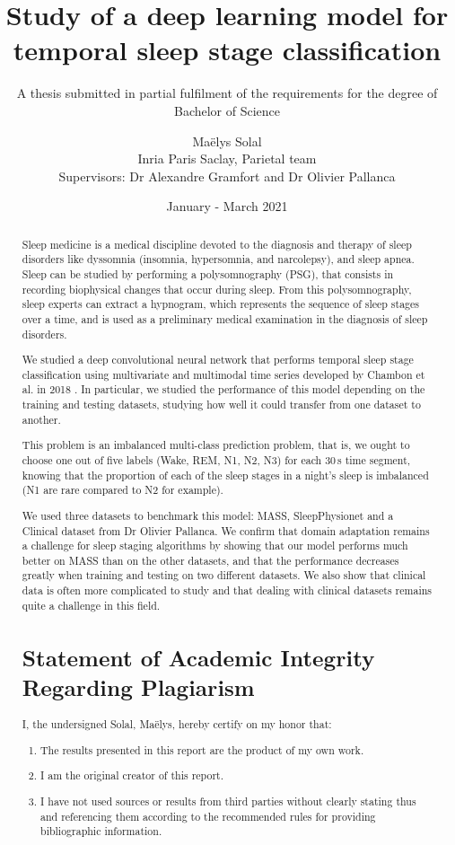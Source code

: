 \documentclass[titlepage, 11pt, a4paper, fancysections]{article}
\title[Sleep Stage Classification - Bachelor Thesis Report]{Study of a deep learning model for temporal sleep stage classification}
\subtitle{A thesis submitted in partial fulfilment of the requirements for the degree of \\ Bachelor of Science}
\author{Ma\"elys Solal\\ Inria Paris Saclay, Parietal team\\ Supervisors: Dr Alexandre Gramfort and Dr Olivier Pallanca}
\date{January - March 2021}
\begin{document}
\maketitle


\begin{abstract}
Sleep medicine is a medical discipline devoted to the diagnosis and therapy of sleep disorders like dyssomnia (insomnia, hypersomnia, and narcolepsy), and sleep apnea. Sleep can be studied by performing a polysomnography (PSG), that consists in recording biophysical changes that occur during sleep. From this polysomnography, sleep experts can extract a hypnogram, which represents the sequence of sleep stages over a time, and is used as a preliminary medical examination in the diagnosis of sleep disorders. 

We studied a deep convolutional neural network that performs temporal sleep stage classification using multivariate and multimodal time series developed by Chambon et al. in 2018 \autocite{chambon-sleep-scoring}. In particular, we studied the performance of this model depending on the training and testing datasets, studying how well it could transfer from one dataset to another. 

This problem is an imbalanced multi-class prediction problem, that is, we ought to choose one out of five labels (Wake, REM, N1, N2, N3) for each 30\,s time segment, knowing that the proportion of each of the sleep stages in a night's sleep is imbalanced (N1 are rare compared to N2 for example). 

We used three datasets to benchmark this model: MASS, SleepPhysionet and a Clinical dataset from Dr Olivier Pallanca. We confirm that domain adaptation remains a challenge for sleep staging algorithms by showing that our model performs much better on MASS than on the other datasets, and that the performance decreases greatly when training and testing on two different datasets. We also show that clinical data is often more complicated to study and that dealing with clinical datasets remains quite a challenge in this field.  

\vspace{1cm}

\section*{Statement of Academic Integrity Regarding Plagiarism}
I, the undersigned Solal, Ma\"elys, hereby certify on my honor that:
\begin{enumerate}
\item The results presented in this report are the product of my own work.
\item I am the original creator of this report.
\item I have not used sources or results from third parties without clearly stating thus and referencing them according to the recommended rules for providing bibliographic information.
\end{enumerate}


\end{abstract}
\end{document}
